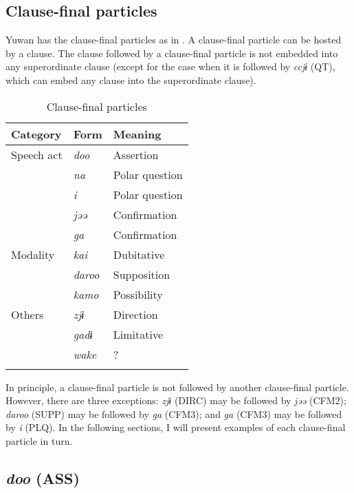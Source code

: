 \begin{xlist}
\section{Clause-final particles}\label{sec:10.3}

Yuwan has the clause-final particles as in . A clause-final particle can be hosted by a clause. The clause followed by a clause-final particle is not embedded into any superordinate clause (except for the case when it is followed by \textit{ccjɨ} (QT), which can embed any clause into the superordinate clause).

\begin{table}
\caption{Clause-final particles\label{tab:99}}
\begin{tabular}{lll}
\lsptoprule
Category & Form & Meaning\\\midrule
Speech act & \textit{doo} &  Assertion\\
           & \textit{na}  &  Polar question\\
           & \textit{i}   &  Polar question\\
           & \textit{jəə} &  Confirmation\\
           & \textit{ga}  &  Confirmation\\
Modality   & \textit{kai} &  Dubitative\\
           & \textit{daroo} & Supposition\\
           & \textit{kamo}  & Possibility\\
Others     & \textit{zjɨ}   & Direction\\
           & \textit{gadɨ}  & Limitative\\
           & \textit{wake}  & ?\\\lspbottomrule
\end{tabular}
\end{table}

In principle, a clause-final particle is not followed by another clause-final particle. However, there are three exceptions: \textit{zjɨ} (DIRC) may be followed by \textit{jəə} (CFM2); \textit{daroo} (SUPP) may be followed by \textit{ga} (CFM3); and \textit{ga} (CFM3) may be followed by \textit{i} (PLQ). In the following sections, I will present examples of each clause-final particle in turn.

\subsection{\textit{doo} (ASS)}\label{sec:10.3.1}


\end{xlist}
